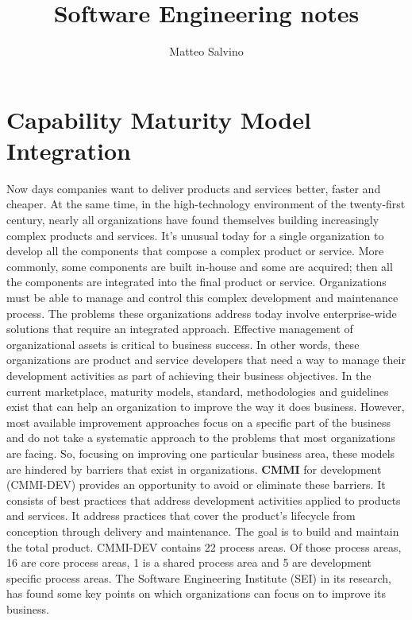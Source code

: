 \documentclass[11pt]{article}
\title{Software Engineering notes}
\author{Matteo Salvino}
\date{}
\begin{document}
\maketitle
\pagebreak
\tableofcontents
\pagebreak
\section{Capability Maturity Model Integration}
Now days companies want to deliver products and services better, faster and cheaper. At the same
time, in the high-technology environment of the twenty-first century, nearly all organizations have found themselves building increasingly complex products and services. It's unusual today for a single organization to develop all the components that compose a complex product or service. More commonly, some components are built in-house and some are acquired; then all the components are integrated into the final product or service. Organizations must be able to manage and control this complex development and maintenance process. The problems these organizations address today involve enterprise-wide solutions that require an integrated approach. Effective management of organizational assets is critical to business success. In other words, these organizations are product and service developers that need a way to manage their development activities as part of achieving their business objectives. In the current marketplace, maturity models, standard, methodologies and guidelines exist that can help an organization to improve the way it does business. However, most available improvement approaches focus on a specific part of the business and do not take a systematic approach to the problems that most organizations are facing. So, focusing on improving one particular business area, these models are hindered by barriers that exist in organizations. \textbf{CMMI} for development (CMMI-DEV) provides an opportunity to avoid or eliminate these barriers. It consists of best practices that address development activities applied to products and services. It address practices that cover the product's lifecycle from conception through delivery and maintenance. The goal is to build and maintain the total product. CMMI-DEV contains 22 process areas. Of those process areas, 16 are core process areas, 1 is a shared process area and 5 are development specific process areas. The Software Engineering Institute (SEI) in its research, has found some key points on which organizations can focus on to improve its business.
\end{document}
